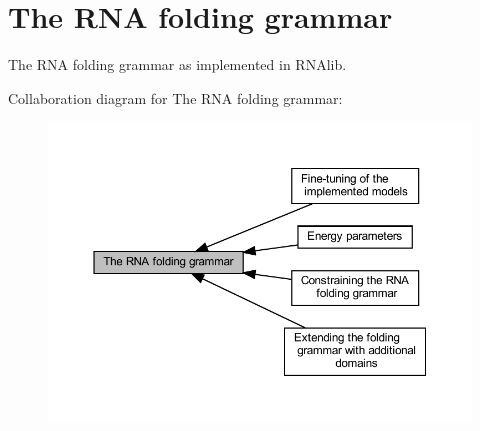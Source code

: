 \hypertarget{group__grammar}{}\section{The R\+NA folding grammar}
\label{group__grammar}


The R\+NA folding grammar as implemented in R\+N\+Alib.  


Collaboration diagram for The R\+NA folding grammar\+:
\nopagebreak
\begin{figure}[H]
\begin{center}
\leavevmode
\includegraphics[width=350pt]{group__grammar}
\end{center}
\end{figure}
